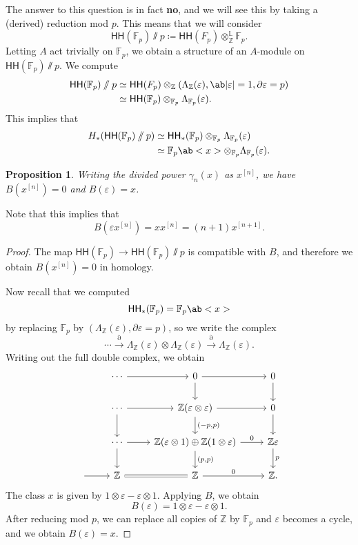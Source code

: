 \documentclass[10pt]{amsart}
\newtheorem{prop}[thm]{Proposition}
\theoremstyle{definition}
\theoremstyle{remark}
\theoremstyle{plain}
\theoremstyle{definition}
\theoremstyle{remark}
\newcommand{\Z}{\mathbb{Z}}
\newcommand{\F}{\mathbb{F}}
\renewcommand{\L}{\mathbb{L}}
\newcommand{\ep}{\varepsilon}
\newcommand{\ms}[1]{\mathsf{#1}}
\newcommand{\1}{\mathbf{1}}
\newcommand{\2}{\mathbf{2}}
\newcommand{\3}{\mathbf{3}}
\newcommand{\HH}{\ms{HH}}
\begin{document}
The answer to this question is in fact \textbf{no}, and we will see this by taking a (derived) reduction mod $p$. This means that we will consider
\[ \HH(\F_p) \sslash p \coloneqq \HH(F_p) \otimes_{\Z}^{\L} \F_p. \]
Letting $A$ act trivially on $\F_p$, we obtain a structure of an $A$-module on $\HH(\F_p) \sslash p$. We compute
\begin{align*}
    \HH(\F_p) \sslash p &\simeq \HH(F_p) \otimes_{\Z} (\Lambda_{\Z}(\ep), \ab|\ep| = 1, \partial \ep = p) \\
    &\simeq \HH(\F_p) \otimes_{\F_p} \Lambda_{\F_p}(\ep).
\end{align*}
This implies that
\begin{align*}
    H_* (\HH(\F_p) \sslash p) &\simeq \HH_*(\F_p) \otimes_{\F_p} \Lambda_{\F_p}(\ep) \\
    &\simeq \F_p \ab<x> \otimes_{\F_p} \Lambda_{\F_p}(\ep).
\end{align*}
\begin{prop}
    Writing the divided power $\gamma_n(x)$ as $x^{[n]}$, we have $B(x^{[n]}) = 0$ and $B(\ep) = x$.
\end{prop}
Note that this implies that 
\[ B(\ep x^{[n]}) = x x^{[n]} = (n+1)x^{[n+1]}. \]

\begin{proof}
    The map $\HH(\F_p) \to \HH(\F_p) \sslash p$ is compatible with $B$, and therefore we obtain $B(x^{[n]}) = 0$ in homology.

    Now recall that we computed
    \[ \HH_*(\F_p) = \F_p\ab<x> \]
    by replacing $\F_p$ by $(\Lambda_{\Z}(\ep), \partial \ep = p)$, so we write the complex
    \[ \cdots \xrightarrow{\partial} \Lambda_{\Z}(\ep) \otimes \Lambda_{\Z} (\ep) \xrightarrow{\partial} \Lambda_{\Z}(\ep). \]
    Writing out the full double complex, we obtain
    \begin{equation*}
    \begin{tikzcd}
        &\cdots \ar{r} & 0 \ar{r} \ar{d} & 0 \ar{d} \\
        &\cdots \ar{r} \ar{d} & \Z(\ep \otimes \ep) \ar{r} \ar{d}{(-p,p)} & 0 \ar{d} \\
        &\cdots \ar{r} \ar{d} & \Z(\ep \otimes 1) \oplus \Z(1 \otimes \ep) \ar{r}{0} \ar{d}{(p,p)}& \Z \ep \ar{d}{p} \\
        {}\ar{r}&\Z \ar[equals]{r} & \Z \ar{r}{0} & \Z.
    \end{tikzcd}
    \end{equation*}
    The class $x$ is given by $1 \otimes \ep - \ep \otimes 1$. Applying $B$, we obtain
    \[ B(\ep) = 1 \otimes \ep - \ep \otimes 1. \]
    After reducing mod $p$, we can replace all copies of $\Z$ by $\F_p$ and $\ep$ becomes a cycle, and we obtain $B(\ep) = x$.
\end{proof}
\end{document}
